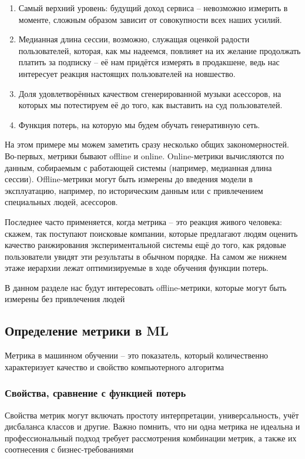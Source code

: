 \begin{enumerate}
    \item Самый верхний уровень: будущий доход сервиса -- невозможно измерить в моменте, сложным образом зависит
    от совокупности всех наших усилий.
    \item Медианная длина сессии, возможно, служащая оценкой радости пользователей, которая, как мы надеемся,
    повлияет на их желание продолжать платить за подписку -- её нам придётся измерять в продакшене, ведь нас
    интересует реакция настоящих пользователей на новшество.
    \item Доля удовлетворённых качеством сгенерированной музыки асессоров, на которых мы потестируем её до того,
    как выставить на суд пользователей.
    \item Функция потерь, на которую мы будем обучать генеративную сеть.
\end{enumerate}
На этом примере мы можем заметить сразу несколько общих закономерностей.
Во-первых, метрики бывают offline и online.
Online-метрики вычисляются по данным, собираемым с работающей системы (например, медианная длина сессии).
Offline-метрики могут быть измерены до введения модели в эксплуатацию, например, по историческим данным или с
привлечением специальных людей, асессоров.

Последнее часто применяется, когда метрика -- это реакция живого человека: скажем, так поступают поисковые
компании, которые предлагают людям оценить качество ранжирования экспериментальной системы ещё до того, как рядовые
пользователи увидят эти результаты в обычном порядке.
На самом же нижнем этаже иерархии лежат оптимизируемые в ходе обучения функции потерь.

В данном разделе нас будут интересовать offline-метрики, которые могут быть измерены без привлечения людей

\subsection{Определение метрики в ML}

Метрика в машинном обучении -- это показатель, который количественно характеризует качество и свойство
компьютерного алгоритма

\subsubsection{Свойства, сравнение с функцией потерь}

Свойства метрик могут включать простоту интерпретации, универсальность, учёт дисбаланса классов и другие.
Важно помнить, что ни одна метрика не идеальна и профессиональный подход требует рассмотрения комбинации метрик,
а также их соотнесения с бизнес-требованиями

